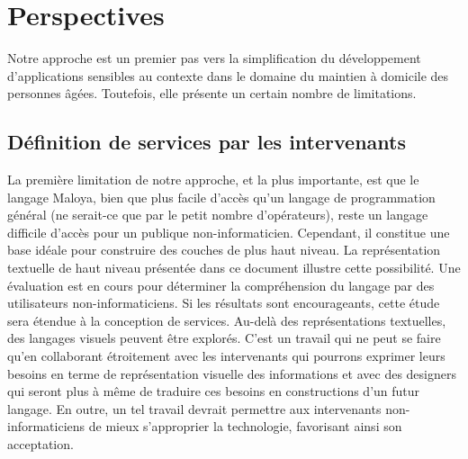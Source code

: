 
\section{Perspectives}
Notre approche est un premier pas vers la simplification du développement d'applications sensibles au contexte dans le domaine du maintien à domicile des personnes âgées. Toutefois, elle présente un certain nombre de limitations.

\subsection*{Définition de services par les intervenants}
La première limitation de notre approche, et la plus importante, est que le langage Maloya, bien que plus facile d'accès qu'un langage de programmation général (ne serait-ce que par le petit nombre d'opérateurs), reste un langage difficile d'accès pour un publique non-informaticien. Cependant, il constitue une base idéale pour construire des couches de plus haut niveau. La représentation textuelle de haut niveau présentée dans ce document illustre cette possibilité. Une évaluation est en cours pour déterminer la compréhension du langage par des utilisateurs non-informaticiens. Si les résultats sont encourageants, cette étude sera étendue à la conception de services. Au-del\`a des représentations textuelles, des langages visuels peuvent \^{e}tre explorés.  C'est un travail qui ne peut se faire qu'en collaborant étroitement avec les intervenants qui pourrons exprimer leurs besoins en terme de représentation visuelle des informations et avec des designers qui seront plus à même de traduire ces besoins en constructions d'un futur langage. En outre, un tel travail devrait permettre aux intervenants non-informaticiens de mieux s'approprier la technologie, favorisant ainsi son acceptation.

